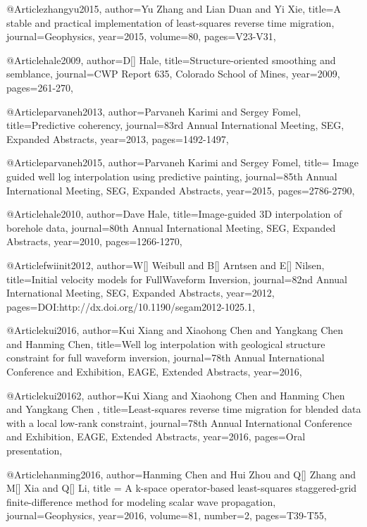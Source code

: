 {@Article{zhangyu2015,
  author={Yu Zhang and Lian Duan and Yi Xie},
  title={A stable and practical implementation of least-squares reverse time migration},
  journal={Geophysics},
  year=2015,
  volume=80,
  pages={V23-V31},
}
	




@Article{hale2009,
  author={D[] Hale},
  title={Structure-oriented smoothing and semblance},
  journal={CWP Report 635, Colorado School of Mines},
  year=2009,
  pages={261-270},
}


@Article{parvaneh2013,
  author={Parvaneh Karimi and Sergey Fomel},
  title={Predictive coherency},
  journal={83rd Annual International Meeting, SEG, Expanded Abstracts},
  year=2013,
  pages={1492-1497},
}

@Article{parvaneh2015,
  author={Parvaneh Karimi and Sergey Fomel},
  title={	Image guided well log interpolation using predictive painting},
  journal={85th Annual International Meeting, SEG, Expanded Abstracts},
  year=2015,
  pages={2786-2790},
}

@Article{hale2010,
  author={Dave Hale},
  title={Image-guided 3D interpolation of borehole data},
  journal={80th Annual International Meeting, SEG, Expanded Abstracts},
  year=2010,
  pages={1266-1270},
}

@Article{fwiinit2012,
  author={W[] Weibull and B[] Arntsen and E[] Nilsen},
  title={Initial velocity models for FullWaveform Inversion},
  journal={82nd Annual International Meeting, SEG, Expanded Abstracts},
  year=2012,
  pages={DOI:http://dx.doi.org/10.1190/segam2012-1025.1},
}



@Article{kui2016,
  author={Kui Xiang and Xiaohong Chen and Yangkang Chen and Hanming Chen},
  title={Well log interpolation with geological structure constraint for full waveform inversion},
  journal={78th Annual International Conference and Exhibition, EAGE, Extended Abstracts},
  year=2016,
}

@Article{kui20162,
  author={Kui Xiang and Xiaohong Chen and Hanming Chen and Yangkang Chen },
  title={Least-squares reverse time migration for blended data with a local low-rank constraint},
  journal={78th Annual International Conference and Exhibition, EAGE, Extended Abstracts},
  year=2016,
  pages={Oral presentation},
}






@Article{hanming2016,
  author={Hanming Chen and Hui Zhou and Q[] Zhang and M[] Xia and Q[] Li},
  title = {A k-space operator-based least-squares staggered-grid finite-difference method for modeling scalar wave propagation},
  journal={Geophysics},
  year=2016,
  volume=81,
  number=2,
  pages={T39-T55},
}



}
